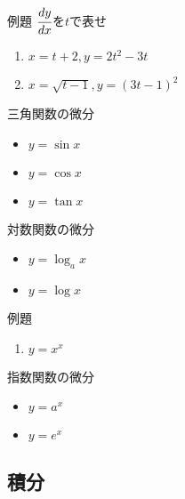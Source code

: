 \documentclass[10pt,dvipdfmx]{jsarticle}
\begin{document}
\begin{itembox}[l]{例題}
  $\cfrac{dy}{dx}$を$t$で表せ
  \begin{large}
    \begin{enumerate}
      \item $x=t+2, y=2t^2-3t$
      \item $x=\sqrt{t-1}, y=(3t-1)^2$
    \end{enumerate}
  \end{large}
\end{itembox}

三角関数の微分
\begin{itemize}
  \item $y=\sin x$
  \item $y=\cos x$
  \item $y=\tan x$
\end{itemize}

対数関数の微分
\begin{itemize}
  \item $y=\log_a x$
  \item $y=\log x$
\end{itemize}

\begin{itembox}[l]{例題}
  \begin{large}
    \begin{enumerate}
      \item $y=x^x$
    \end{enumerate}
  \end{large}
\end{itembox}

指数関数の微分
\begin{itemize}
  \item $y=a^x$
  \item $y=e^x$
\end{itemize}

\subsection*{積分}
\end{document}
